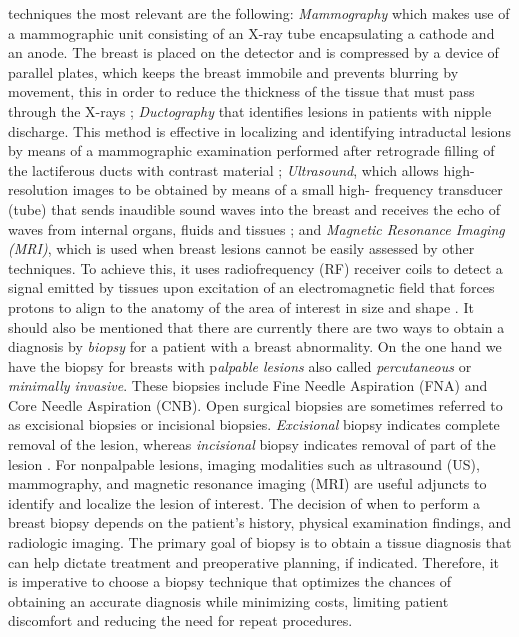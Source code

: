 techniques the most relevant are the following: \textit{Mammography} which makes use of a mammographic unit consisting of an X-ray tube encapsulating a cathode and an anode. The breast is placed on the detector and is compressed by a device of parallel plates, which keeps the breast immobile and prevents blurring by movement, this in order to reduce the thickness of the tissue that must pass through the X-rays \cite{Ebrahimi2019}; \textit{Ductography} that identifies lesions in patients with nipple discharge. This method is effective in localizing and identifying intraductal lesions by means of a mammographic examination performed after retrograde filling of the lactiferous ducts with contrast material \cite{Hirose2007}; \textit{Ultrasound}, which allows high-resolution images to be obtained by means of a small high- frequency transducer (tube) that sends inaudible sound waves into the breast and receives the echo of waves from internal organs, fluids and tissues \cite{Hasan2019}; and \textit{Magnetic Resonance Imaging (MRI)}, which is used when breast lesions cannot be easily assessed by other techniques. To achieve this, it uses radiofrequency (RF) receiver coils to detect a signal emitted by tissues upon excitation of an electromagnetic field that forces protons to align to the anatomy of the area of interest in size and shape \cite{Tse2014}. It should also be mentioned that there are currently there are two ways to obtain a diagnosis by \textit{biopsy} for a patient with a breast abnormality. On the one hand we have the biopsy for breasts with p\textit{alpable lesions} also called \textit{percutaneous} or \textit{minimally invasive}. These biopsies include Fine Needle Aspiration (FNA) and Core Needle Aspiration (CNB). Open surgical biopsies are sometimes referred to as excisional biopsies or incisional biopsies. \textit{Excisional} biopsy indicates complete removal of the lesion, whereas \textit{incisional} biopsy indicates removal of part of the lesion \cite{Greenfield2012}. For nonpalpable lesions, imaging modalities such as ultrasound (US), mammography, and magnetic resonance imaging (MRI) are useful adjuncts to identify and localize the lesion of interest. The decision of when to perform a breast biopsy depends on the patient's history, physical examination findings, and radiologic imaging. The primary goal of biopsy is to obtain a tissue diagnosis that can help dictate treatment and preoperative planning, if indicated. Therefore, it is imperative to choose a biopsy technique that optimizes the chances of obtaining an accurate diagnosis while minimizing costs, limiting patient discomfort and reducing the need for repeat procedures\cite{Samilia2018}.
